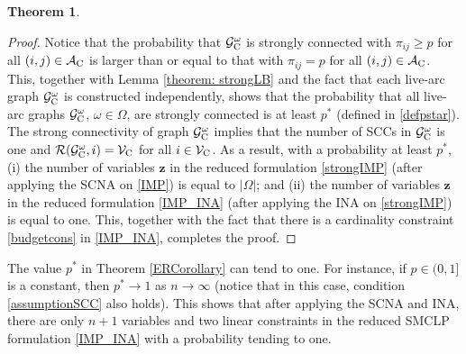 \documentclass[a4paper,10pt]{article}
\newcommand{\G}{\mathcal{G}}
\newcommand{\V}{\mathcal{V}}
\newcommand{\A}{\mathcal{A}}
\theoremstyle{plain}
\newtheorem{theorem}{Theorem}[section]
\newcommand{\revv}[1]{{#1}}
\begin{document}
{\begin{theorem}
\begin{equation}
			\end{equation}
		\end{theorem}
		\begin{proof}
			Notice that the probability that $\mathcal{G}^\omega_{\rm{C}}$ is strongly connected with $\pi_{ij} \geq p$ for all $(i,j) \in \A_{\rm{C}}$ is larger than or equal to that with $\pi_{ij}=p$ for all $(i,j) \in \A_{\rm{C}}$.
			This, together with  Lemma \ref{theorem: strongLB} and the fact that each live-arc graph $\mathcal{G}^\omega_{\rm{C}}$ is constructed independently, 
			shows that the probability that all live-arc graphs $\mathcal{G}_{\rm{C}}^\omega$, $\omega \in \Omega$, are strongly connected is at least $p^*$ (defined in \eqref{defpstar}).
			The strong connectivity of graph $\mathcal{G}_{\rm{C}}^\omega$ implies that the number of SCCs in $\mathcal{G}_{\rm{C}}^\omega$ is one and $\mathcal{R}(\G_{\rm{C}}^{\omega},i)=\V_{\rm{C}}$ for all $i \in \V_{\rm{C}}$.
			As a result, with a probability at least $p^*$, (i) the number of variables $\boldsymbol{z}$ in the reduced formulation \eqref{strongIMP} (after applying the SCNA on \eqref{IMP}) is equal to $|\Omega|$; and (ii) the number of variables $\boldsymbol{z}$ in the reduced formulation \eqref{IMP_INA} (after applying the INA on \eqref{strongIMP}) is equal to one.
			\revv{This, together with the fact that there is a cardinality constraint \eqref{budgetcons} in \eqref{IMP_INA}, completes the proof.}
		\end{proof}
		The value $p^*$ in Theorem \ref{ERCorollary} can tend to one.
		For instance,  if $p \in(0,1]$ is a constant, then $p^* \rightarrow  1$ as $n \rightarrow \infty$ (notice that in this case, condition \eqref{assumptionSCC} also holds).
		This shows that after applying the SCNA and INA,  there are only $n+1$ variables and two linear constraints in the reduced SMCLP formulation \eqref{IMP_INA} with a probability tending to one. 
		
}
\end{document}
